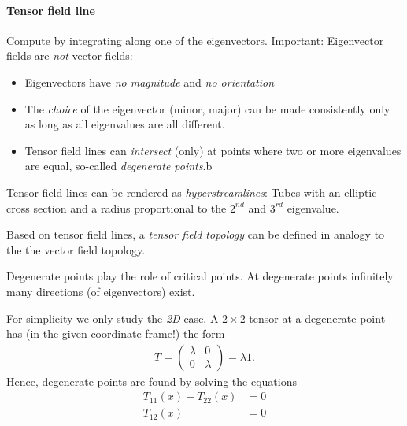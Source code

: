 \paragraph{Tensor field line} Compute by integrating along one of the eigenvectors. Important: Eigenvector fields are \emph{not} vector fields:
\begin{itemize}
    \item Eigenvectors have \emph{no magnitude} and \emph{no orientation} 
    \item The \emph{choice} of the eigenvector (minor, major) can be made consistently only as long as all eigenvalues are all different.
    \item Tensor field lines can \emph{intersect} (only) at points where two or more eigenvalues are equal, so-called \emph{degenerate points}.b
\end{itemize}

Tensor field lines can be rendered as \emph{hyperstreamlines}: Tubes with an elliptic cross section and a radius proportional to the $2^{nd}$ and $3^{rd}$ eigenvalue.

Based on tensor field lines, a \emph{tensor field topology} can be defined in analogy to the the vector field topology.

Degenerate points play the role of critical points. At degenerate points infinitely many directions (of eigenvectors) exist. 

For simplicity we only study the \emph{2D} case. A $2\times 2$ tensor at a degenerate point has (in the given coordinate frame!) the form
\begin{align*}
 T =
     \begin{pmatrix}
         \lambda & 0\\
         0 &\lambda
     \end{pmatrix} = \lambda 1.
\end{align*}
Hence, degenerate points are found by solving the equations
\begin{align*}
    T_{11}(x) - T_{22}(x) &= 0\\
    T_{12}(x) &= 0
\end{align*}

